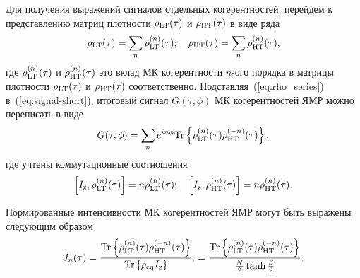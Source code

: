 Для получения выражений сигналов отдельных когерентностей,
перейдем к представлению матриц плотности
$\rho_\mathrm{LT} (\tau)$ и $\rho_\mathrm{HT} (\tau)$
в виде ряда
%
\begin{equation}\label{eq:rho_series}
  \rho_\mathrm{LT} (\tau) = \sum_n \rho_\mathrm{LT}^{(n)}(\tau); \quad
  \rho_\mathrm{HT} (\tau) = \sum_n \rho_\mathrm{HT}^{(n)}(\tau),
\end{equation}
%
где $\rho_\mathrm{LT}^{(n)} (\tau)$ и  $\rho_\mathrm{HT}^{(n)} (\tau)$
это вклад МК когерентности $n$-ого порядка
в матрицы плотности $\rho_\mathrm{LT} (\tau)$ и $\rho_\mathrm{HT} (\tau)$ соответственно.
Подставляя~(\ref{eq:rho_series}) в~(\ref{eq:signal-short}), итоговый сигнал $G(\tau, \phi)$ МК когерентностей ЯМР можно переписать в виде
%
\begin{equation}
    \label{eq:signal_series}
    G(\tau, \phi) = \sum\limits_n
    e^{in\phi}\mathrm{Tr} \left\{ 
    \rho_\mathrm{LT}^{(n)}(\tau) \rho_\mathrm{HT}^{(-n)} (\tau)
     \right\},
\end{equation}
%
где учтены коммутационные соотношения
%
\begin{equation}
    \left[I_\mathrm{z}, \rho_\mathrm{LT}^{(n)} (\tau) \right] = n  \rho_\mathrm{LT}^{(n)} (\tau);
    \quad
    \left[I_\mathrm{z}, \rho_\mathrm{HT}^{(n)} (\tau) \right] = n  \rho_\mathrm{HT}^{(n)} (\tau).
\end{equation}

Нормированные интенсивности МК когерентностей ЯМР могут быть выражены следующим образом
%
\begin{equation}\label{eq:coherence}
    J_n(\tau)
    = \dfrac{
       \mathrm{Tr} \left\{ 
        \rho_\mathrm{LT}^{(n)}(\tau) \rho_\mathrm{HT}^{(-n)} (\tau)
         \right\}
    }{\mathrm{Tr} \left\{ \rho_{\mathrm{eq}}I_\mathrm{z} \right\}}.
    = \dfrac{
       \mathrm{Tr} \left\{ 
        \rho_\mathrm{LT}^{(n)}(\tau) \rho_\mathrm{HT}^{(-n)} (\tau)
         \right\}
    }{\frac N 2 \tanh \frac \beta 2}.
\end{equation}

